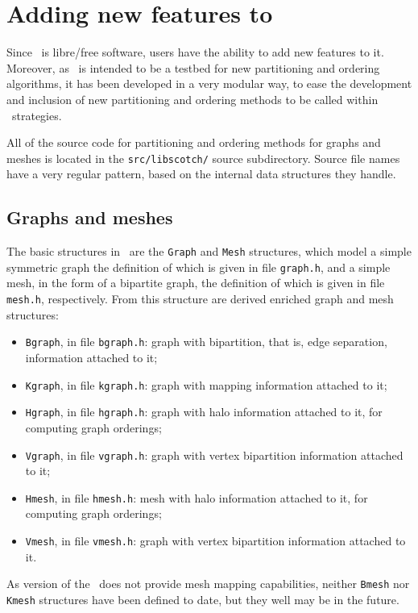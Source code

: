 
\section{Adding new features to \scotch}
\label{sec-coding}

Since \scotch\ is libre/free software, users have the ability
to add new features to it. Moreover, as \scotch\ is intended to be a
testbed for new partitioning and ordering algorithms, it has been
developed in a very modular way, to ease the development and inclusion
of new partitioning and ordering methods to be called within
\scotch\ strategies.

All of the source code for partitioning and ordering methods for
graphs and meshes is located in the {\tt src/\lbt libscotch/} source
subdirectory. Source file names have a very regular pattern, based on
the internal data structures they handle.

\subsection{Graphs and meshes}

The basic structures in \scotch\ are the {\tt Graph} and {\tt Mesh}
structures, which model a simple symmetric graph the definition of
which is given in file {\tt graph.h}, and a simple mesh, in the form
of a bipartite graph, the definition of which is given in file {\tt
mesh.h}, respectively. From this structure are derived enriched graph
and mesh structures:
\begin{itemize}
\item
{\tt Bgraph}, in file {\tt bgraph.h}: graph with bipartition, that is,
edge separation, information attached to it;
\item
{\tt Kgraph}, in file {\tt kgraph.h}: graph with mapping information
attached to it;
\item
{\tt Hgraph}, in file {\tt hgraph.h}: graph with halo information
attached to it, for computing graph orderings;
\item
{\tt Vgraph}, in file {\tt vgraph.h}: graph with vertex bipartition
information attached to it;
\item
{\tt Hmesh}, in file {\tt hmesh.h}: mesh with halo information
attached to it, for computing graph orderings;
\item
{\tt Vmesh}, in file {\tt vmesh.h}: graph with vertex bipartition
information attached to it.
\end{itemize}
As version {} of the \libscotch\ does not provide mesh
mapping capabilities, neither {\tt Bmesh} nor {\tt Kmesh} structures
have been defined to date, but they well may be in the future.

